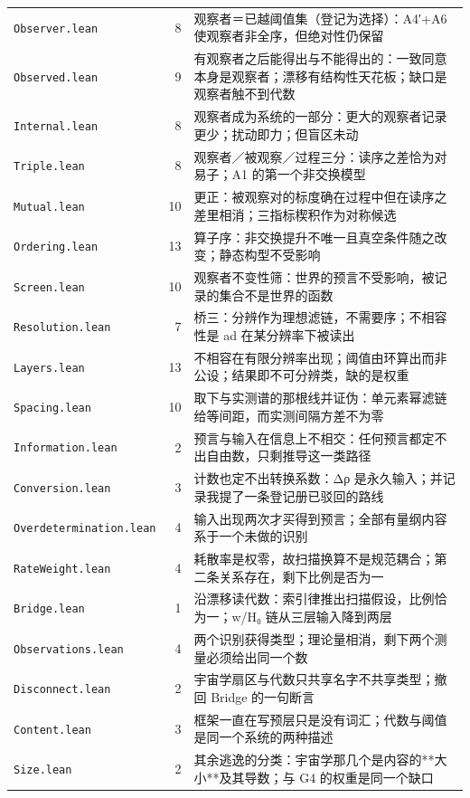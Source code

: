 \documentclass[11pt,a4paper]{article}
\theoremstyle{sudef}
\begin{document}
\begin{center}
\begin{longtable}{lrl}
\texttt{Observer.lean} & 8 & 观察者＝已越阈值集（登记为选择）：A4′+A6 使观察者非全序，但绝对性仍保留 \\
\texttt{Observed.lean} & 9 & 有观察者之后能得出与不能得出的：一致同意本身是观察者；漂移有结构性天花板；缺口是观察者触不到代数 \\
\texttt{Internal.lean} & 8 & 观察者成为系统的一部分：更大的观察者记录更少；扰动即力；但盲区未动 \\
\texttt{Triple.lean} & 8 & 观察者／被观察／过程三分：读序之差恰为对易子；A1 的第一个非交换模型 \\
\texttt{Mutual.lean} & 10 & 更正：被观察对的标度确在过程中但在读序之差里相消；三指标楔积作为对称候选 \\
\texttt{Ordering.lean} & 13 & 算子序：非交换提升不唯一且真空条件随之改变；静态构型不受影响 \\
\texttt{Screen.lean} & 10 & 观察者不变性筛：世界的预言不受影响，被记录的集合不是世界的函数 \\
\texttt{Resolution.lean} & 7 & 桥三：分辨作为理想滤链，不需要序；不相容性是 ad 在某分辨率下被读出 \\
\texttt{Layers.lean} & 13 & 不相容在有限分辨率出现；阈值由环算出而非公设；结果即不可分辨类，缺的是权重 \\
\texttt{Spacing.lean} & 10 & 取下与实测谱的那根线并证伪：单元素幂滤链给等间距，而实测间隔方差不为零 \\
\texttt{Information.lean} & 2 & 预言与输入在信息上不相交：任何预言都定不出自由数，只剩推导这一类路径 \\
\texttt{Conversion.lean} & 3 & 计数也定不出转换系数：Δρ 是永久输入；并记录我提了一条登记册已驳回的路线 \\
\texttt{Overdetermination.lean} & 4 & 输入出现两次才买得到预言；全部有量纲内容系于一个未做的识别 \\
\texttt{RateWeight.lean} & 4 & 耗散率是权零，故扫描换算不是规范耦合；第二条关系存在，剩下比例是否为一 \\
\texttt{Bridge.lean} & 1 & 沿漂移读代数：索引律推出扫描假设，比例恰为一；w/H₀ 链从三层输入降到两层 \\
\texttt{Observations.lean} & 4 & 两个识别获得类型；理论量相消，剩下两个测量必须给出同一个数 \\
\texttt{Disconnect.lean} & 2 & 宇宙学扇区与代数只共享名字不共享类型；撤回 Bridge 的一句断言 \\
\texttt{Content.lean} & 3 & 框架一直在写预层只是没有词汇；代数与阈值是同一个系统的两种描述 \\
\texttt{Size.lean} & 2 & 其余逃逸的分类：宇宙学那几个是内容的**大小**及其导数；与 G4 的权重是同一个缺口 \\

\end{longtable}
\end{center}
\end{document}
